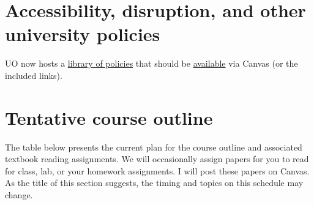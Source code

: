 \documentclass[10pt]{article}
\begin{document}
\section*{Accessibility, disruption, and other university policies}

UO now hosts a \href{https://provost.uoregon.edu/academic-policies-procedures-and-guidance}{library of policies} that should be \href{https://teaching.uoregon.edu/university-course-policies}{available} via Canvas (or the included links).

\section*{Tentative course outline}

The table below presents the current plan for the course outline and associated textbook reading assignments. We will occasionally assign papers for you to read for class, lab, or your homework assignments. I will post these papers on Canvas. As the title of this section suggests, the timing and topics on this schedule may change.
\end{document}
